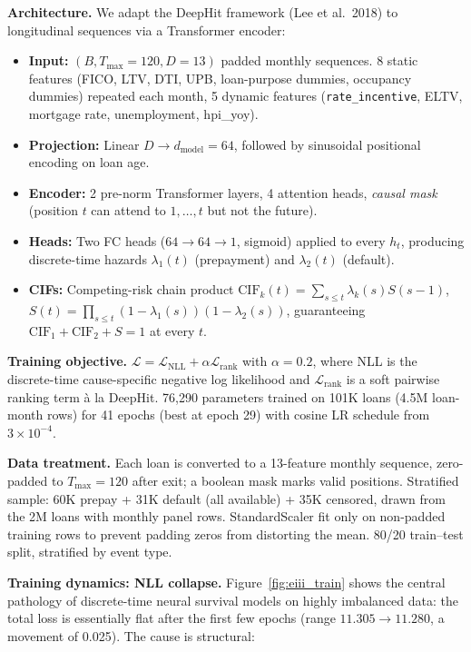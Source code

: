\documentclass[11pt,a4paper]{article}
\begin{document}
\textbf{Architecture.} We adapt the DeepHit framework (Lee et al.\ 2018) to longitudinal sequences via a Transformer encoder:
\begin{itemize}[leftmargin=1.2em,itemsep=2pt,topsep=2pt]
  \item \textbf{Input:} $(B, T_{\max}{=}120, D{=}13)$ padded monthly sequences. 8 static features (FICO, LTV, DTI, UPB, loan-purpose dummies, occupancy dummies) repeated each month, 5 dynamic features (\texttt{rate\_incentive}, ELTV, mortgage rate, unemployment, hpi\_yoy).
  \item \textbf{Projection:} Linear $D \to d_{\text{model}} = 64$, followed by sinusoidal positional encoding on loan age.
  \item \textbf{Encoder:} 2 pre-norm Transformer layers, 4 attention heads, \emph{causal mask} (position $t$ can attend to $1, \ldots, t$ but not the future).
  \item \textbf{Heads:} Two FC heads ($64 \to 64 \to 1$, sigmoid) applied to every $h_t$, producing discrete-time hazards $\lambda_1(t)$ (prepayment) and $\lambda_2(t)$ (default).
  \item \textbf{CIFs:} Competing-risk chain product $\text{CIF}_k(t) = \sum_{s \le t} \lambda_k(s) S(s-1)$, $S(t) = \prod_{s \le t}(1-\lambda_1(s))(1-\lambda_2(s))$, guaranteeing $\text{CIF}_1 + \text{CIF}_2 + S = 1$ at every $t$.
\end{itemize}

\textbf{Training objective.} $\mathcal{L} = \mathcal{L}_{\text{NLL}} + \alpha \mathcal{L}_{\text{rank}}$ with $\alpha = 0.2$, where NLL is the discrete-time cause-specific negative log likelihood and $\mathcal{L}_{\text{rank}}$ is a soft pairwise ranking term à la DeepHit. 76{,}290 parameters trained on 101K loans (4.5M loan-month rows) for 41 epochs (best at epoch 29) with cosine LR schedule from $3 \times 10^{-4}$.

\textbf{Data treatment.} Each loan is converted to a 13-feature monthly sequence, zero-padded to $T_{\max} = 120$ after exit; a boolean mask marks valid positions. Stratified sample: 60K prepay + 31K default (all available) + 35K censored, drawn from the 2M loans with monthly panel rows. StandardScaler fit only on non-padded training rows to prevent padding zeros from distorting the mean. 80/20 train--test split, stratified by event type.

\textbf{Training dynamics: NLL collapse.} Figure~\ref{fig:eiii_train} shows the central pathology of discrete-time neural survival models on highly imbalanced data: the total loss is essentially flat after the first few epochs (range $11.305 \to 11.280$, a movement of 0.025). The cause is structural:
\end{document}
